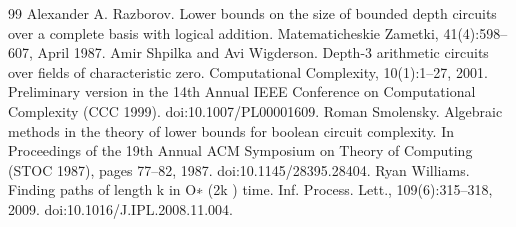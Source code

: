 \begin{thebibliography}{99}
 Alexander A. Razborov. Lower bounds on the size of bounded depth circuits over a complete basis with logical addition. Matematicheskie Zametki, 41(4):598–607, April 1987.
 Amir Shpilka and Avi Wigderson. Depth-3 arithmetic circuits over fields of characteristic zero. Computational Complexity, 10(1):1–27, 2001. Preliminary version in the 14th Annual IEEE Conference on Computational Complexity (CCC 1999). doi:10.1007/PL00001609.
 Roman Smolensky. Algebraic methods in the theory of lower bounds for boolean circuit complexity. In Proceedings of the 19th Annual ACM Symposium on Theory of Computing (STOC 1987), pages 77–82, 1987. doi:10.1145/28395.28404.
 Ryan Williams. Finding paths of length k in O∗ (2k ) time. Inf. Process. Lett., 109(6):315–318, 2009. doi:10.1016/J.IPL.2008.11.004.
\end{thebibliography}
